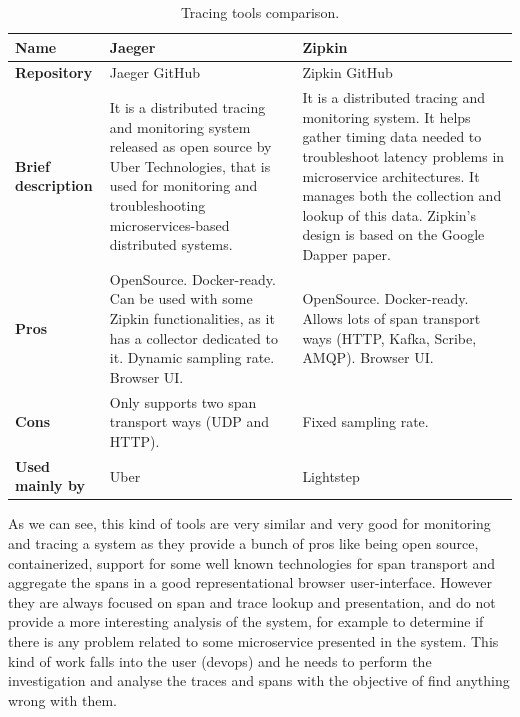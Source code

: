 \begin{table}[H]
\caption{Tracing tools comparison.}
\label{table:tracing_tools}
\centering
\large
\begin{tabularx}{\linewidth} {
    |>{\hsize=0.70\hsize}X| 
     >{\hsize=1.15\hsize}X|
     >{\hsize=1.15\hsize}X| }
     \hline
    \textbf{Name} 
    & Jaeger
    & Zipkin \\ \hline
    \textbf{Repository}
    & Jaeger GitHub \cite{jaeger_github}
    & Zipkin GitHub \cite{zipkin_github} \\ \hline
    \textbf{Brief description}
    & It is a distributed tracing and monitoring system released as open source by Uber Technologies, that is used for monitoring and troubleshooting microservices-based distributed systems.
    & It is a distributed tracing and monitoring system. It helps gather timing data needed to troubleshoot latency problems in microservice architectures. It manages both the collection and lookup of this data. Zipkin’s design is based on the Google Dapper paper. \\ \hline
    \textbf{Pros}
    & OpenSource. \newline
    Docker-ready. \newline
    Can be used with some Zipkin functionalities, as it has a collector dedicated to it. \newline
    Dynamic sampling rate. \newline
    Browser UI.
    & OpenSource. \newline
    Docker-ready. \newline
    Allows lots of span transport ways (HTTP, Kafka, Scribe, AMQP). \newline
    Browser UI. \\ \hline
    \textbf{Cons} 
    & Only supports two span transport ways (UDP and HTTP).
    & Fixed sampling rate. \\ \hline
    \textbf{Used mainly by}
    & Uber
    & Lightstep \\ \hline
\end{tabularx}
\end{table}

As we can see, this kind of tools are very similar and very good for monitoring and tracing a system as they provide a bunch of pros like being open source, containerized, support for some well known technologies for span transport and aggregate the spans in a good representational browser user-interface. However they are always focused on span and trace lookup and presentation, and do not provide a more interesting analysis of the system, for example to determine if there is any problem related to some microservice presented in the system. This kind of work falls into the user (\gls{devops}) and he needs to perform the investigation and analyse the traces and spans with the objective of find anything wrong with them.

